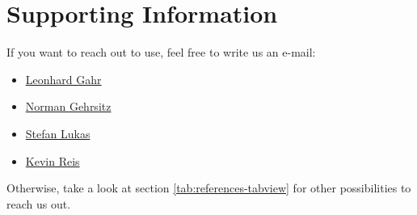 \documentclass[a4paper,12pt,chapterprefix=false,bibliography=totoc,listof=totoc,]{scrreprt}
\begin{document}
\chapter{Supporting Information}
If you want to reach out to use, feel free to write us an e-mail:
\begin{itemize}
	\item \href{mailto:gahr.leonhard@student.dhbw-karlsruhe.de}{Leonhard Gahr}
	\item \href{mailto:gehrsitz.norman@student.dhbw-karlsruhe.de}{Norman Gehrsitz}
	\item \href{mailto:lukas.stefan@student.dhbw-karlsruhe.de}{Stefan Lukas}
	\item \href{mailto:reis.kevin@student.dhbw-karlsruhe.de}{Kevin Reis}
\end{itemize}

Otherwise, take a look at section \ref{tab:references-tabview} for other possibilities to reach us out.
\end{document}
